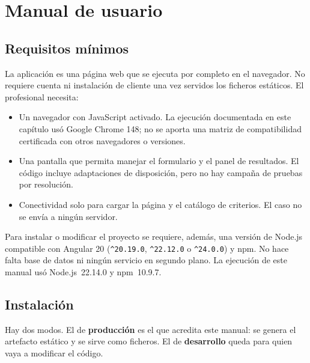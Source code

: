 
\chapter{Manual de usuario}
\label{cap:manual}

\section{Requisitos mínimos}

La aplicación es una página web que se ejecuta por completo en el
navegador. No requiere cuenta ni instalación de cliente una vez servidos
los ficheros estáticos. El profesional necesita:

\begin{itemize}[leftmargin=1.4em,itemsep=0.2em]
  \item Un navegador con JavaScript activado. La ejecución documentada
  en este capítulo usó Google Chrome 148; no se aporta una matriz de
  compatibilidad certificada con otros navegadores o versiones.
  \item Una pantalla que permita manejar el formulario y el panel de
  resultados. El código incluye adaptaciones de disposición, pero no hay
  campaña de pruebas por resolución.
  \item Conectividad solo para cargar la página y el catálogo de
  criterios. El caso no se envía a ningún servidor.
\end{itemize}

Para instalar o modificar el proyecto se requiere, además, una versión
de Node.js compatible con Angular 20 (\texttt{\^{}20.19.0},
\texttt{\^{}22.12.0} o \texttt{\^{}24.0.0}) y npm. No hace falta base de
datos ni ningún servicio en segundo plano. La ejecución de este manual
usó Node.js~22.14.0 y npm~10.9.7.

\section{Instalación}

Hay dos modos. El de \textbf{producción} es el que acredita este manual:
se genera el artefacto estático y se sirve como ficheros. El de
\textbf{desarrollo} queda para quien vaya a modificar el código.


